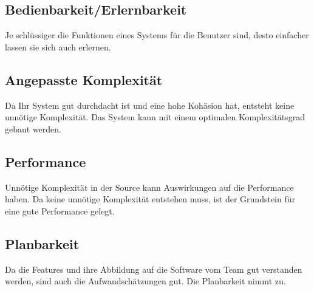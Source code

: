 \documentclass[a4paper, ngerman, 12pt, usenames, dvipsnames]{article}
\begin{document}
\subsection{Bedienbarkeit/Erlernbarkeit}
Je schlüssiger die Funktionen eines Systems für die Benutzer sind, desto einfacher lassen sie sich auch erlernen.
\subsection{Angepasste Komplexität}
Da Ihr System gut durchdacht ist und eine hohe Kohäsion hat, entsteht keine unnötige Komplexität. Das System kann mit einem optimalen Komplexitätsgrad gebaut werden.
\subsection{Performance}
Unnötige Komplexität in der Source kann Auswirkungen auf die Performance haben. Da keine unnötige Komplexität entstehen muss, ist der Grundstein für eine gute Performance gelegt.
\subsection{Planbarkeit}
Da die Features und ihre Abbildung auf die Software vom Team gut verstanden werden, sind auch die Aufwandschätzungen gut. Die Planbarkeit nimmt zu.
\end{document}
